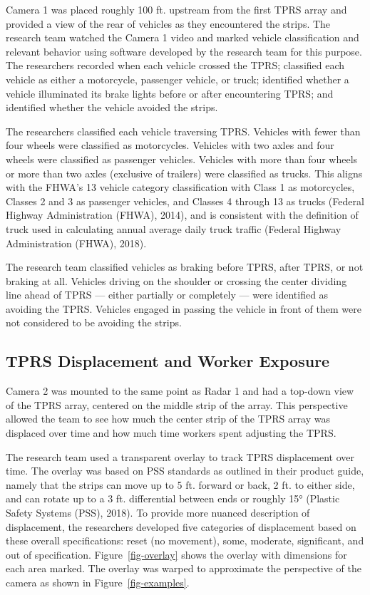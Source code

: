 \documentclass[
  letterpaper,
]{trb}
\begin{document}
Camera 1 was placed roughly 100 ft. upstream from the first TPRS array
and provided a view of the rear of vehicles as they encountered the
strips. The research team watched the Camera 1 video and marked vehicle
classification and relevant behavior using software developed by the
research team for this purpose. The researchers recorded when each
vehicle crossed the TPRS; classified each vehicle as either a
motorcycle, passenger vehicle, or truck; identified whether a vehicle
illuminated its brake lights before or after encountering TPRS; and
identified whether the vehicle avoided the strips.

The researchers classified each vehicle traversing TPRS. Vehicles with
fewer than four wheels were classified as motorcycles. Vehicles with two
axles and four wheels were classified as passenger vehicles. Vehicles
with more than four wheels or more than two axles (exclusive of
trailers) were classified as trucks. This aligns with the FHWA's 13
vehicle category classification with Class 1 as motorcycles, Classes 2
and 3 as passenger vehicles, and Classes 4 through 13 as trucks (Federal
Highway Administration (FHWA), 2014), and is consistent with the
definition of truck used in calculating annual average daily truck
traffic (Federal Highway Administration (FHWA), 2018).

The research team classified vehicles as braking before TPRS, after
TPRS, or not braking at all. Vehicles driving on the shoulder or
crossing the center dividing line ahead of TPRS --- either partially or
completely --- were identified as avoiding the TPRS. Vehicles engaged in
passing the vehicle in front of them were not considered to be avoiding
the strips.

\subsection{TPRS Displacement and Worker
Exposure}\label{tprs-displacement-and-worker-exposure}

Camera 2 was mounted to the same point as Radar 1 and had a top-down
view of the TPRS array, centered on the middle strip of the array. This
perspective allowed the team to see how much the center strip of the
TPRS array was displaced over time and how much time workers spent
adjusting the TPRS.

The research team used a transparent overlay to track TPRS displacement
over time. The overlay was based on PSS standards as outlined in their
product guide, namely that the strips can move up to 5 ft. forward or
back, 2 ft. to either side, and can rotate up to a 3 ft. differential
between ends or roughly 15° (Plastic Safety Systems (PSS), 2018). To
provide more nuanced description of displacement, the researchers
developed five categories of displacement based on these overall
specifications: reset (no movement), some, moderate, significant, and
out of specification. Figure~\ref{fig-overlay} shows the overlay with
dimensions for each area marked. The overlay was warped to approximate
the perspective of the camera as shown in Figure~\ref{fig-examples}.
\end{document}

